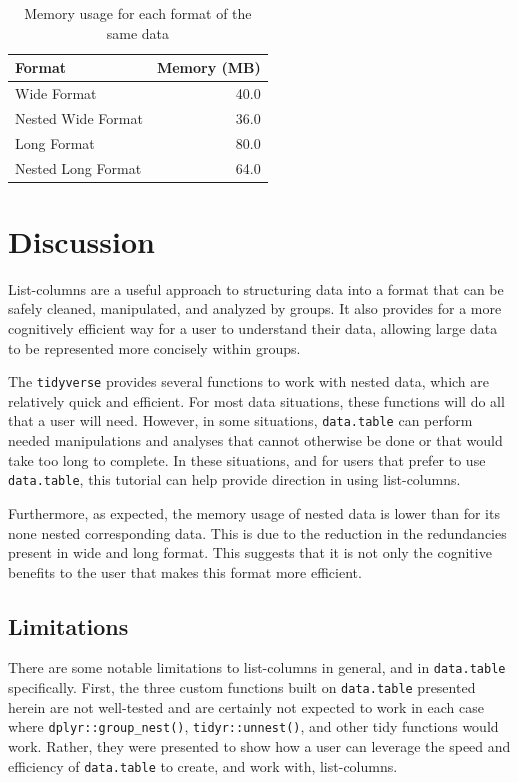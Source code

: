 \begin{table}[ht]
\centering
\caption{Memory usage for each format of the same data} 
\label{memtab}
\begin{tabular}{lr}
  \toprule
Format & Memory (MB) \\ 
  \midrule
Wide Format & 40.0 \\ 
  Nested Wide Format & 36.0 \\ 
  Long Format & 80.0 \\ 
  Nested Long Format & 64.0 \\ 
   \bottomrule
\end{tabular}
\end{table}

\hypertarget{discussion}{%
\section{Discussion}\label{discussion}}

List-columns are a useful approach to structuring data into a format
that can be safely cleaned, manipulated, and analyzed by groups. It also
provides for a more cognitively efficient way for a user to understand
their data, allowing large data to be represented more concisely within
groups.

The \texttt{tidyverse} provides several functions to work with nested
data, which are relatively quick and efficient. For most data
situations, these functions will do all that a user will need. However,
in some situations, \texttt{data.table} can perform needed manipulations
and analyses that cannot otherwise be done or that would take too long
to complete. In these situations, and for users that prefer to use
\texttt{data.table}, this tutorial can help provide direction in using
list-columns.

Furthermore, as expected, the memory usage of nested data is lower than
for its none nested corresponding data. This is due to the reduction in
the redundancies present in wide and long format. This suggests that it
is not only the cognitive benefits to the user that makes this format
more efficient.

\hypertarget{limitations}{%
\subsection{Limitations}\label{limitations}}

There are some notable limitations to list-columns in general, and in
\texttt{data.table} specifically. First, the three custom functions
built on \texttt{data.table} presented herein are not well-tested and
are certainly not expected to work in each case where
\texttt{dplyr::group\_nest()}, \texttt{tidyr::unnest()}, and other tidy
functions would work. Rather, they were presented to show how a user can
leverage the speed and efficiency of \texttt{data.table} to create, and
work with, list-columns.

